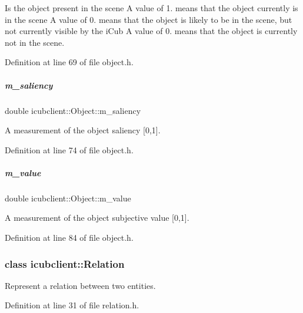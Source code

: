 Is the object present in the scene A value of 1. means that the object currently is in the scene A value of 0. means that the object is likely to be in the scene, but not currently visible by the i\+Cub A value of 0. means that the object is currently not in the scene. 



Definition at line 69 of file object.\+h.

\mbox{\label{group__icubclient__representations_a0d5e8b5dce9751c5439b50461a16782a}} 
\subparagraph{\texorpdfstring{m\+\_\+saliency}{m\_saliency}}
{\footnotesize\ttfamily double icubclient\+::\+Object\+::m\+\_\+saliency}



A measurement of the object saliency \mbox{[}0,1\mbox{]}. 



Definition at line 74 of file object.\+h.

\mbox{\label{group__icubclient__representations_a6d330b102ce154567c0532a345950f2a}} 
\subparagraph{\texorpdfstring{m\+\_\+value}{m\_value}}
{\footnotesize\ttfamily double icubclient\+::\+Object\+::m\+\_\+value}



A measurement of the object subjective value \mbox{[}0,1\mbox{]}. 



Definition at line 84 of file object.\+h.

\label{classicubclient_1_1Relation}
\subsubsection{class icubclient\+:\+:Relation}
Represent a relation between two entities. 

Definition at line 31 of file relation.\+h.

